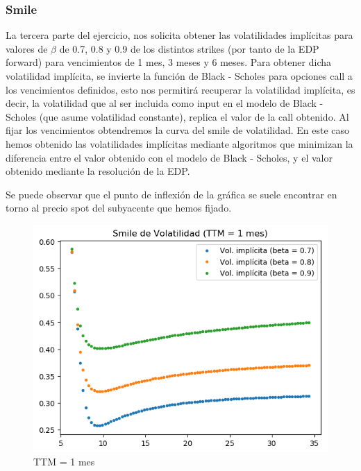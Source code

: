 \documentclass[titlepage]{article}
\begin{document}
\newpage
\subsubsection*{Smile}

La tercera parte del ejercicio, nos solicita obtener las volatilidades implícitas para valores de $\beta$ de 0.7, 0.8 y 0.9 de los distintos strikes (por tanto de la EDP forward) para vencimientos de 1 mes, 3 meses y 6 meses. Para obtener dicha volatilidad implícita, se invierte la función de Black - Scholes para opciones call a los vencimientos definidos, esto nos permitirá recuperar la volatilidad implícita, es decir, la volatilidad que al ser incluida como input en el modelo de Black - Scholes (que asume volatilidad constante), replica el valor de la call obtenido. Al fijar los vencimientos obtendremos la curva del smile de volatilidad. En este caso hemos obtenido las volatilidades implícitas mediante algoritmos que minimizan la diferencia entre el valor obtenido con el modelo de Black - Scholes, y el valor obtenido mediante la resolución de la EDP. 

\vspace{5pt}
Se puede observar que el punto de inflexión de la gráfica se suele encontrar en torno al precio spot del subyacente que hemos fijado.

\begin{figure}[h]
	\centering
	\includegraphics[scale=0.65]{TTM1}
	\caption{TTM = 1 mes}
\end{figure}
\end{document}
